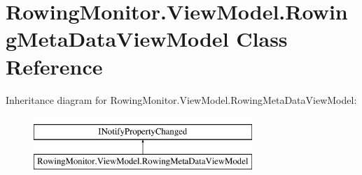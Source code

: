 \hypertarget{class_rowing_monitor_1_1_view_model_1_1_rowing_meta_data_view_model}{}\section{Rowing\+Monitor.\+View\+Model.\+Rowing\+Meta\+Data\+View\+Model Class Reference}
\label{class_rowing_monitor_1_1_view_model_1_1_rowing_meta_data_view_model}
Inheritance diagram for Rowing\+Monitor.\+View\+Model.\+Rowing\+Meta\+Data\+View\+Model\+:\begin{figure}[H]
\begin{center}
\leavevmode
\includegraphics[height=2.000000cm]{class_rowing_monitor_1_1_view_model_1_1_rowing_meta_data_view_model}
\end{center}
\end{figure}
